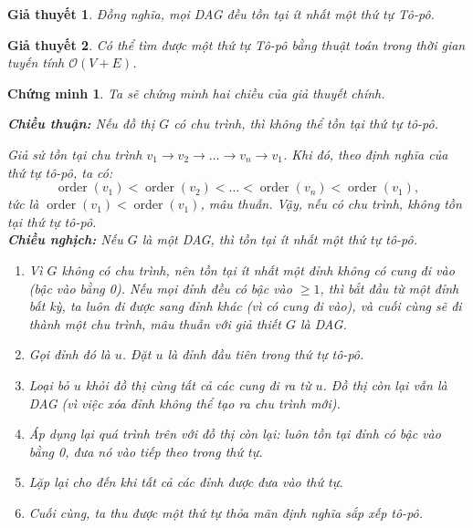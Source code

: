 \documentclass{article}
\newtheorem{giathuyet}{Giả thuyết}
\newtheorem{chungminh}{Chứng minh}
\begin{document}
\begin{giathuyet}
    Đồng nghĩa, mọi DAG đều tồn tại ít nhất một thứ tự Tô-pô.
\end{giathuyet}

\begin{giathuyet}
    Có thể tìm được một thứ tự Tô-pô bằng thuật toán trong thời gian tuyến tính \( \mathcal{O}(V + E) \).
\end{giathuyet}

\begin{chungminh}
Ta sẽ chứng minh hai chiều của giả thuyết chính.

\textbf{Chiều thuận:} Nếu đồ thị \( G \) có chu trình, thì không thể tồn tại thứ tự tô-pô.

Giả sử tồn tại chu trình \( v_1 \to v_2 \to \dots \to v_n \to v_1 \). Khi đó, theo định nghĩa của thứ tự tô-pô, ta có:
\[
\operatorname{order}(v_1) < \operatorname{order}(v_2) < \dots < \operatorname{order}(v_n) < \operatorname{order}(v_1),
\]
tức là \( \operatorname{order}(v_1) < \operatorname{order}(v_1) \), mâu thuẫn. Vậy, nếu có chu trình, không tồn tại thứ tự tô-pô.\\

\textbf{Chiều nghịch:} Nếu \( G \) là một DAG, thì tồn tại ít nhất một thứ tự tô-pô.

\begin{enumerate}
    \item Vì \( G \) không có chu trình, nên tồn tại ít nhất một đỉnh không có cung đi vào (bậc vào bằng 0). Nếu mọi đỉnh đều có bậc vào \(\geq 1\), thì bắt đầu từ một đỉnh bất kỳ, ta luôn đi được sang đỉnh khác (vì có cung đi vào), và cuối cùng sẽ đi thành một chu trình, mâu thuẫn với giả thiết \( G \) là DAG.

    \item Gọi đỉnh đó là \( u \). Đặt \( u \) là đỉnh đầu tiên trong thứ tự tô-pô.

    \item Loại bỏ \( u \) khỏi đồ thị cùng tất cả các cung đi ra từ \( u \). Đồ thị còn lại vẫn là DAG (vì việc xóa đỉnh không thể tạo ra chu trình mới).

    \item Áp dụng lại quá trình trên với đồ thị còn lại: luôn tồn tại đỉnh có bậc vào bằng 0, đưa nó vào tiếp theo trong thứ tự.

    \item Lặp lại cho đến khi tất cả các đỉnh được đưa vào thứ tự.

    \item Cuối cùng, ta thu được một thứ tự thỏa mãn định nghĩa sắp xếp tô-pô.
\end{enumerate}


\end{chungminh}
\end{document}
